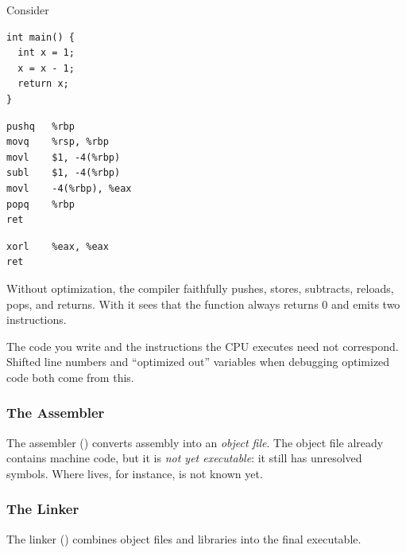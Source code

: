 \begin{example}
  Consider
\begin{lstlisting}
int main() {
  int x = 1;
  x = x - 1;
  return x;
}
\end{lstlisting}
  \noindent
  \begin{minipage}[t]{0.47\linewidth}
  \centering\small{}
\begin{lstlisting}[style=sh]
pushq   %rbp
movq    %rsp, %rbp
movl    $1, -4(%rbp)
subl    $1, -4(%rbp)
movl    -4(%rbp), %eax
popq    %rbp
ret
\end{lstlisting}
  \end{minipage}\hfill
  \begin{minipage}[t]{0.47\linewidth}
  \centering\small{}
\begin{lstlisting}[style=sh]
xorl    %eax, %eax
ret
\end{lstlisting}
  \end{minipage}

  Without optimization, the compiler faithfully pushes, stores, subtracts, reloads, pops, and returns. With  it sees that the function always returns $0$ and emits two instructions.
\end{example}

\begin{keypoint}
  The code you write and the instructions the CPU executes need not correspond. Shifted line numbers and ``optimized out'' variables when debugging optimized code both come from this.
\end{keypoint}

\subsubsection{The Assembler}

The assembler () converts assembly into an \emph{object file}. The object file already contains machine code, but it is \emph{not yet executable}: it still has unresolved symbols. Where  lives, for instance, is not known yet.

\subsubsection{The Linker}

The linker () combines object files and libraries into the final executable.

